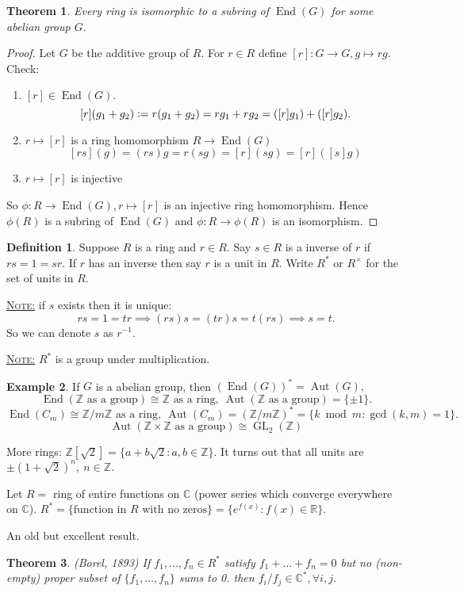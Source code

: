 \documentclass{article}
\newcommand{\R}{\mathbb{R}}
\newcommand{\C}{\mathbb{C}}
\newcommand{\Z}{\mathbb{Z}}
\def \GL {\operatorname{GL}}
\def \End {\operatorname{End}}
\def \Aut {\operatorname{Aut}}
\newcommand{\defeq}{\vcentcolon=}
\newcommand{\fancyem}[1]{\underline{\textsc{#1}}}
\newtheorem{theorem}{Theorem}[section]
\theoremstyle{definition}
\newtheorem{definition}{Definition}[section]
\newtheorem{example}[theorem]{Example}
\theoremstyle{remark}
\begin{document}
\begin{theorem}
Every ring is isomorphic to a subring of $\operatorname{End}(G)$ for some abelian group $G.$
\end{theorem}
\begin{proof}
Let $G$ be the additive group of $R$. For $r \in R$ define $[r]: G \to G, g \mapsto rg.$ Check:
\begin{enumerate}
\item
	$[r] \in \operatorname{End}(G).$
	\[[r](g_1 + g_2) \defeq r(g_1 + g_2) = rg_1 + rg_2 = ([r]g_1) + ([r]g_2).\]
\item
	$r \mapsto [r]$ is a ring homomorphism $R \to \End(G)$
	\[
	[rs](g) = (rs)g = r(sg) = [r](sg) = [r]([s]g)
	\]
\item
	$r \mapsto [r]$ is injective
\end{enumerate}
So $\phi: R \to \End(G), r \mapsto [r]$ is an injective ring homomorphism. Hence $\phi(R)$ is a subring of $\End(G)$ and $\phi: R \to \phi(R)$ is an isomorphism.
\end{proof}

\begin{definition}
Suppose $R$ is a ring and $r \in R.$ Say $s \in R$ is a inverse of $r$ if $rs = 1 = sr.$ If $r$ has an inverse then say $r$ is a unit in $R$. Write $R^*$ or $R^\times$ for the set of units in $R$. 
\end{definition}

\fancyem{Note:} if $s$ exists then it is unique:
\[rs = 1 = tr\implies (rs)s = (tr)s = t(rs) \implies s = t.\]
So we can denote $s$ as $r^{-1}.$

\fancyem{Note:} $R^*$ is a group under multiplication.

\begin{example}
If $G$ is a abelian group, then $(\End(G))^* = \Aut(G),$ 
\[\End(\Z \text{ as a group}) \cong \Z \text{ as a ring},\ \Aut(\Z \text{ as a group}) = \{\pm 1\}.\]
\[\End(C_m) \cong \Z/m\Z \text{ as a ring},\ \Aut(C_m) = (\Z/m\Z)^* = \{k \bmod m: \gcd(k, m) = 1\}.\]
\[\Aut(\Z \times \Z \text{ as a group}) \cong \GL_2(\Z)\]
\end{example}

More rings:
$\Z[\sqrt{2}] = \{a + b\sqrt{2}: a, b \in \Z\}.$ It turns out that all units are $\pm(1  + \sqrt{2})^n,\ n \in \Z.$

Let $R = $ ring of entire functions on $\C$ (power series which converge everywhere on $\C$). $R^* = \{\text{function in $R$ with no zeros}\} = \{e^{f(x)}: f(x) \in \R\}.$

An old but excellent result.
\begin{theorem}(Borel, 1893)
If $f_1, \ldots, f_n \in R^*$ satisfy $f_1 + \ldots + f_n = 0$ but no (non-empty) proper subset of $\{f_1, \ldots, f_n\}$ sums to 0. then $f_i / f_j \in \C^*, \forall i, j.$  
\end{theorem}
\end{document}
